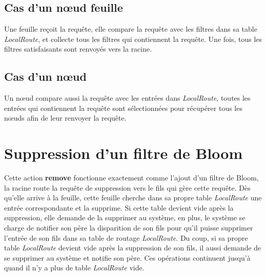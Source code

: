 \documentclass[a4paper,11pt]{report}
\begin{document}
\subsection{Cas d'un nœud feuille}
	Une feuille reçoit la requête, elle compare la requête avec les filtres dans sa table \textit{LocalRoute}, et collecte tous les filtres qui contiennent la requête. Une fois, tous les filtres satisfaisants sont renvoyés vers la racine.

\subsection{Cas d'un nœud}
	Un nœud compare aussi la requête avec les entrées dans \textit{LocalRoute}, toutes les entrées qui contiennent la requête sont sélectionnées pour récupérer tous les nœuds afin de leur renvoyer la requête.
	
\section{Suppression d'un filtre de Bloom}
	Cette action \textbf{remove} fonctionne exactement comme l'ajout d'un filtre de Bloom, la racine route la requête de suppression vers le fils qui gère cette requête. Dès qu'elle arrive à la feuille, cette feuille cherche dans sa propre table \textit{LocalRoute} une entrée correspondante et la supprime. Si cette table devient vide après la suppression, elle demande de la supprimer au système, en plus, le système se charge de notifier son père la disparition de son fils pour qu'il puisse supprimer l'entrée de son fils dans sa table de routage \textit{LocalRoute}. Du coup, si sa propre table \textit{LocalRoute} devient vide après la suppression de son fils, il aussi demande de se supprimer au système et notifie son père. Ces opérations continuent jusqu'à quand il n'y a plus de table \textit{LocalRoute} vide.
\end{document}
